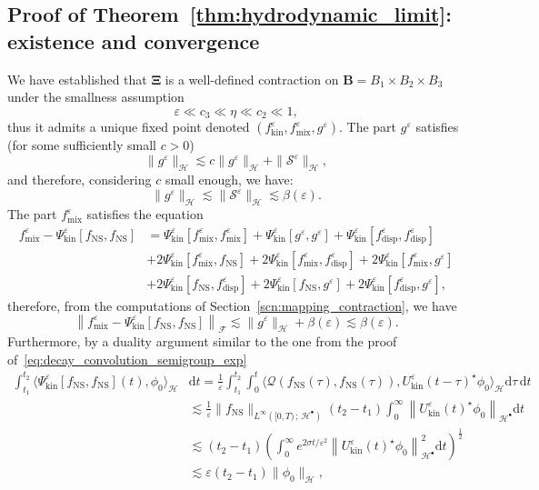 \documentclass[AHL,Unicode,longabstracts,published]{cedram}
\newcommand{\ns}{\mathrm{NS}}
\newcommand{\mix}{\mathrm{mix}}
\newcommand{\kin}{\mathrm{kin}}
\renewcommand{\d}{\mathrm{d}}
\newcommand{\disp}{\mathrm{disp}}
\newcommand{\HH}{\mathcal{H}}
\newcommand{\QQ}{\mathcal{Q}}
\renewcommand{\SS}{\mathcal{S}}
\newcommand{\FFF}{\mathscr{F}}
\newcommand{\HHH}{\mathscr{H}}
\newcommand{\SSs}{\HH}
\newcommand{\SSsp}{\HH^{\bullet}}
\newcommand{\SSSs}{\HHH}
\newcommand{\SSSm}{\FFF}
\newcommand*\eps{{\varepsilon}}
\newcommand{\la}{\langle}
\newcommand{\ra}{\rangle}
\begin{document}
\subsection{Proof of Theorem~\ref{thm:hydrodynamic_limit}: existence and convergence}

We have established that $\bm{\Xi}$ is a well-defined contraction on $\bm{B}=B_1 \times B_2 \times B_3$ under the smallness assumption
\[
\eps \ll c_3 \ll \eta \ll c_2 \ll 1,
\]
thus it admits a unique fixed point denoted $(f^\eps_\kin, f^\eps_\mix, g^\eps)$. The part $g^\eps$ satisfies (for some sufficiently small $c > 0$)
\begin{equation*}
\| g^\eps \|_{\SSSs} \lesssim c \| g^\eps \|_{ \SSSs } + \| \SS^\eps \|_{ \SSSs },
\end{equation*}
and therefore, considering $c$ small enough, we have:
\begin{equation*}
\| g^\eps \|_{\SSSs} \lesssim \| \SS^\eps \|_{\SSSs} \lesssim \beta(\eps).
\end{equation*}
The part $f^\eps_\mix$ satisfies the equation
\begin{align*}
f^\eps_\mix - \Psi^\eps_\kin[f_\ns, f_\ns] &= \Psi^\eps_\kin\left[f^\eps_\mix, f^\eps_\mix\right] + \Psi^\eps_\kin\left[g^\eps, g^\eps\right] + \Psi^\eps_\kin\left[f^\eps_\disp, f^\eps_\disp\right] \\
& + 2 \Psi^\eps_\kin\left[f^\eps_\mix, f_\ns\right] + 2 \Psi^\eps_\kin\left[f^\eps_\mix, f_\disp^\eps\right] + 2 \Psi^\eps_\kin\left[f^\eps_\mix, g^\eps\right] \\
& + 2 \Psi^\eps_\kin\left[f_\ns, f^\eps_\disp\right] + 2 \Psi^\eps_\kin\left[f_\ns, g^\eps\right] + 2 \Psi^\eps_\kin\left[f^\eps_\disp, g^\eps\right],
\end{align*}
therefore, from the computations of Section~\ref{scn:mapping_contraction}, we have
\[
\left\| f^\eps_\mix - \Psi^\eps_\kin\left[f_\ns, f_\ns\right] \right\|_{ \SSSm } \lesssim \| g^\eps \|_{ \SSSs } + \beta(\eps) \lesssim \beta(\eps).
\]
Furthermore, by a duality argument similar to the one from the proof of~\eqref{eq:decay_convolution_semigroup_exp}
\begin{align*}
\int_{t_1}^{t_2} \big\la \Psi^\eps_\kin[f_\ns, f_\ns](t), \phi_0 \big\ra_{\SSs} &\d t = \frac{1}{\eps} \int_{t_1}^{t_2} \int_0^t \big\la \QQ\left(f_\ns(\tau), f_\ns(\tau) \right), U^\eps_\kin(t-\tau)^\star \phi_0 \big\ra_{\SSs} \d \tau \, \d t \\
& \lesssim \frac{1}{\eps} \| f_\ns \|_{ L^\infty\left([0, T)\,;\,\SSsp \right) } (t_2 - t_1) \int_0^\infty \left\| U^\eps_\kin(t)^\star \phi_0 \right\|_{ \SSsp } \d t \\
& \lesssim (t_2 - t_1) \left(\int_0^\infty e^{2 \sigma t / \eps^2} \left\| U^\eps_\kin(t)^\star \phi_0 \right\|_{ \SSsp }^2 \d t\right)^{\frac{1}{2}} \\
&\lesssim \eps (t_2 - t_1) \| \phi_0 \|_{\SSs},
\end{align*}
\end{document}

